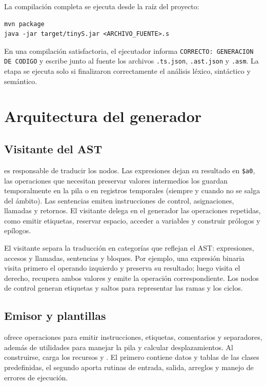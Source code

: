 La compilación completa se ejecuta desde la raíz del proyecto:
\begin{verbatim}
mvn package
java -jar target/tinyS.jar <ARCHIVO_FUENTE>.s
\end{verbatim}
En una compilación satisfactoria, el ejecutador informa
\texttt{CORRECTO: GENERACION DE CODIGO} y escribe junto al fuente los
archivos \texttt{.ts.json}, \texttt{.ast.json} y \texttt{.asm}. La etapa
se ejecuta solo si finalizaron correctamente el análisis léxico,
sintáctico y semántico.

\section{Arquitectura del generador}
\label{sec:arquitectura-generador}

\subsection{Visitante del AST}
 es responsable de traducir los nodos. Las
expresiones dejan su resultado en \texttt{\$a0}, las operaciones que
necesitan preservar valores intermedios los guardan temporalmente en la
pila o en registros temporales (siempre y cuando no se salga del ámbito). Las sentencias emiten instrucciones de
control, asignaciones, llamadas y retornos. El visitante delega en el
generador las operaciones repetidas, como emitir etiquetas, reservar
espacio, acceder a variables y construir prólogos y epílogos.

El visitante separa la traducción en categorías que reflejan el AST:
expresiones, accesos y llamadas, sentencias y bloques. Por ejemplo, una
expresión binaria visita primero el operando izquierdo y preserva su
resultado; luego visita el derecho, recupera ambos valores y emite la
operación correspondiente. Los nodos de control generan etiquetas y
saltos para representar las ramas y los ciclos.

\subsection{Emisor y plantillas}
 ofrece operaciones para emitir instrucciones,
etiquetas, comentarios y separadores, además de utilidades para manejar
la pila y calcular desplazamientos. Al construirse, carga los recursos
 y . El primero
contiene datos y tablas de las clases predefinidas, el segundo aporta
rutinas de entrada, salida, arreglos y manejo de errores de ejecución.

